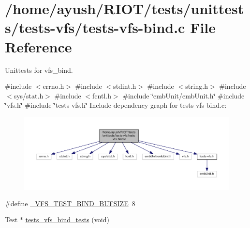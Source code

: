 \hypertarget{tests-vfs-bind_8c}{}\section{/home/ayush/\+R\+I\+O\+T/tests/unittests/tests-\/vfs/tests-\/vfs-\/bind.c File Reference}
\label{tests-vfs-bind_8c}


Unittests for vfs\+\_\+bind.  


{\ttfamily \#include $<$errno.\+h$>$}\newline
{\ttfamily \#include $<$stdint.\+h$>$}\newline
{\ttfamily \#include $<$string.\+h$>$}\newline
{\ttfamily \#include $<$sys/stat.\+h$>$}\newline
{\ttfamily \#include $<$fcntl.\+h$>$}\newline
{\ttfamily \#include \char`\"{}emb\+Unit/emb\+Unit.\+h\char`\"{}}\newline
{\ttfamily \#include \char`\"{}vfs.\+h\char`\"{}}\newline
{\ttfamily \#include \char`\"{}tests-\/vfs.\+h\char`\"{}}\newline
Include dependency graph for tests-\/vfs-\/bind.c\+:
\nopagebreak
\begin{figure}[H]
\begin{center}
\leavevmode
\includegraphics[width=350pt]{tests-vfs-bind_8c__incl}
\end{center}
\end{figure}
\begin{DoxyCompactItemize}
\item 
\#define \hyperlink{tests-vfs-bind_8c_a35bd6d79e47ef40d437218e91e714a67}{\+\_\+\+V\+F\+S\+\_\+\+T\+E\+S\+T\+\_\+\+B\+I\+N\+D\+\_\+\+B\+U\+F\+S\+I\+ZE}~8
\item 
Test $\ast$ \hyperlink{tests-vfs-bind_8c_a93aa0948d1133fbb161d95ab38a0a19f}{tests\+\_\+vfs\+\_\+bind\+\_\+tests} (void)
\end{DoxyCompactItemize}


